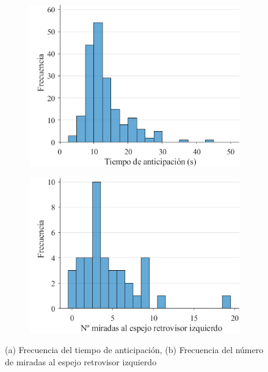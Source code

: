 \begin{figure}[h]
  \centering
  \begin{subfigure}[b]{0.45\textwidth}
    \includegraphics[width=\textwidth]{figures/3.16a.png}
    \caption{}
    \label{fig:3.16a}
  \end{subfigure}
  \hfill
  \begin{subfigure}[b]{0.45\textwidth}
    \includegraphics[width=\textwidth]{figures/3.16b.png}
    \caption{}
    \label{fig:3.16b}
  \end{subfigure}
  \caption{(a) Frecuencia del tiempo de anticipación, (b) Frecuencia del número de miradas al espejo retrovisor izquierdo}
  \label{fig:3.16}
\end{figure}

